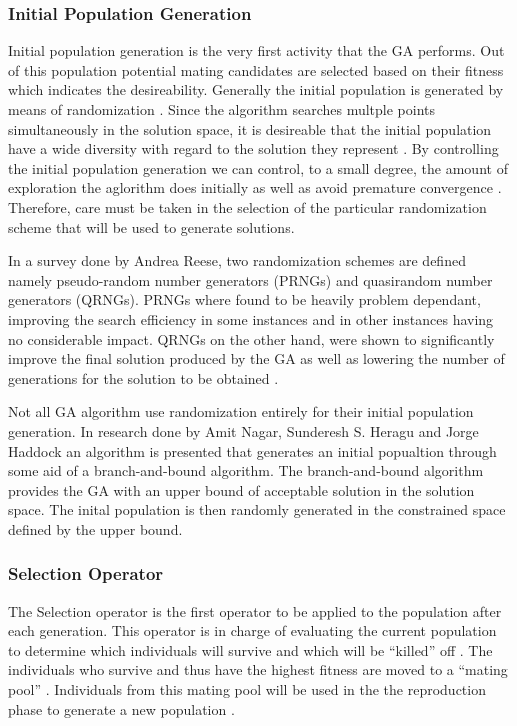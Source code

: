 \subsubsection{Initial Population Generation}
Initial population generation is the very first activity that the GA performs. Out of this population potential mating candidates are selected based on their fitness which indicates the desireability. Generally the initial population is generated by means of randomization \cite{SelfAdaptiveGA}. Since the algorithm searches multple points simultaneously in the solution space, it is desireable that the initial population have a wide diversity with regard to the solution they represent \cite{CombinedBranchBoundGA,DistributedHierarchicalGA}. By controlling the initial population generation we can control, to a small degree, the amount of exploration the aglorithm does initially as well as avoid premature convergence \cite{CombinedBranchBoundGA}. Therefore, care must be taken in the selection of the particular randomization scheme that will be used to generate solutions.

In a survey done by Andrea Reese, two randomization schemes are defined namely pseudo-random number generators (PRNGs) and quasirandom number generators (QRNGs). PRNGs where found to be heavily problem dependant, improving the search efficiency in some instances and in other instances having no considerable impact. QRNGs on the other hand, were shown to significantly improve the final solution produced by the GA as well as lowering the number of generations for the solution to be obtained \cite{RandomNumberGA}.

Not all GA algorithm use randomization entirely for their initial population generation. In research done by Amit Nagar, Sunderesh S. Heragu and Jorge Haddock an algorithm is presented that generates an initial popualtion through some aid of a branch-and-bound algorithm. The branch-and-bound algorithm provides the GA with an upper bound of acceptable solution in the solution space. The inital population is then randomly generated in the constrained space defined by the upper bound\cite{CombinedBranchBoundGA}.
\subsubsection{Selection Operator}
The Selection operator is the first operator to be applied to the population after each generation. This operator is in charge of evaluating the current population to determine which individuals will survive and which will be ``killed'' off \cite{CoactiveFuzzyGA,CombinedBranchBoundGA,ConstrainedGA}. The individuals who survive and thus have the highest fitness are moved to a ``mating pool'' \cite{HumanPassiveGA}. Individuals from this mating pool will be used in the the reproduction phase to generate a new population \cite{AdaptiveSAGA,AcceleratingGA}.

